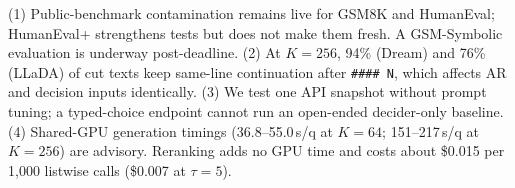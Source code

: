 (1) Public-benchmark contamination remains live for GSM8K and HumanEval; HumanEval+ strengthens tests but does not make them fresh. A GSM-Symbolic \cite{mirzadeh2024gsmsymbolic} evaluation is underway post-deadline. (2) At $K=256$, 94\% (Dream) and 76\% (LLaDA) of cut texts keep same-line continuation after \texttt{\#\#\#\#~N}, which affects AR and decision inputs identically. (3) We test one API snapshot without prompt tuning; a typed-choice endpoint cannot run an open-ended decider-only baseline. (4) Shared-GPU generation timings (36.8--55.0\,s/q at $K=64$; 151--217\,s/q at $K=256$) are advisory. Reranking adds no GPU time and costs about \$0.015 per 1,000 listwise calls (\$0.007 at $\tau=5$).
